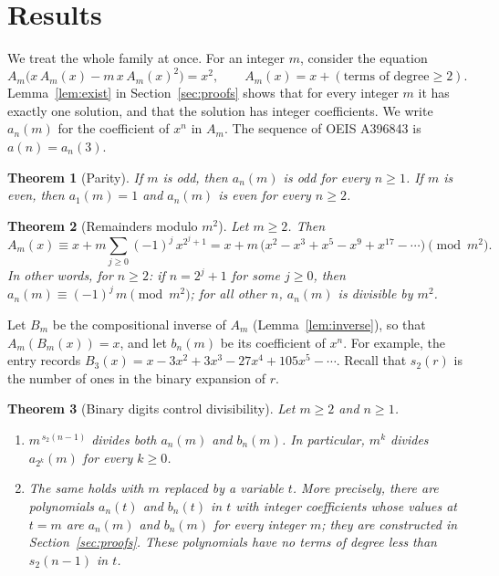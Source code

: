 \documentclass[11pt,a4paper]{article}
\newtheorem{theorem}{Theorem}[section]
\theoremstyle{definition}
\theoremstyle{remark}
\begin{document}
\section{Results}\label{sec:results}

We treat the whole family at once. For an integer $m$, consider the equation
\begin{equation}\label{eq:general}
A_m\bigl(x\,A_m(x)-m\,x\,A_m(x)^2\bigr)=x^2,\qquad A_m(x)=x+(\text{terms of degree}\ge2).
\end{equation}
Lemma~\ref{lem:exist} in Section~\ref{sec:proofs} shows that for every integer $m$ it has exactly one solution, and
that the solution has integer coefficients. We write $a_n(m)$ for the coefficient of $x^n$ in $A_m$. The sequence of
OEIS A396843 is $a(n)=a_n(3)$.

\begin{theorem}[Parity]\label{thm:parity}
If $m$ is odd, then $a_n(m)$ is odd for every $n\ge1$. If $m$ is even, then $a_1(m)=1$ and $a_n(m)$ is even for every
$n\ge2$.
\end{theorem}

\begin{theorem}[Remainders modulo $m^2$]\label{thm:modsq}
Let $m\ge2$. Then
\[
A_m(x)\equiv x+m\sum_{j\ge0}(-1)^j\,x^{2^j+1}=x+m\,\bigl(x^2-x^3+x^5-x^9+x^{17}-\cdots\bigr)\pmod{m^2}.
\]
In other words, for $n\ge2$: if $n=2^j+1$ for some $j\ge0$, then $a_n(m)\equiv(-1)^j\,m\pmod{m^2}$; for all other $n$,
$a_n(m)$ is divisible by $m^2$.
\end{theorem}

Let $B_m$ be the compositional inverse of $A_m$ (Lemma~\ref{lem:inverse}), so that $A_m(B_m(x))=x$, and let $b_n(m)$ be
its coefficient of $x^n$. For example, the entry records $B_{3}(x)=x-3x^2+3x^3-27x^4+105x^5-\cdots.$
Recall that $s_2(r)$ is the number of ones in the binary expansion of $r$.

\begin{theorem}[Binary digits control divisibility]\label{thm:binary}
Let $m\ge2$ and $n\ge1$.
\begin{enumerate}[label=(\alph*)]
\item $m^{\,s_2(n-1)}$ divides both $a_n(m)$ and $b_n(m)$. In particular, $m^k$ divides $a_{2^k}(m)$ for every $k\ge0$.
\item The same holds with $m$ replaced by a variable $t$. More precisely, there are polynomials $a_n(t)$ and $b_n(t)$
in $t$ with integer coefficients whose values at $t=m$ are $a_n(m)$ and $b_n(m)$ for every integer $m$; they are
constructed in Section~\ref{sec:proofs}. These polynomials have no terms of degree less than $s_2(n-1)$ in $t$.
\end{enumerate}
\end{theorem}
\end{document}
